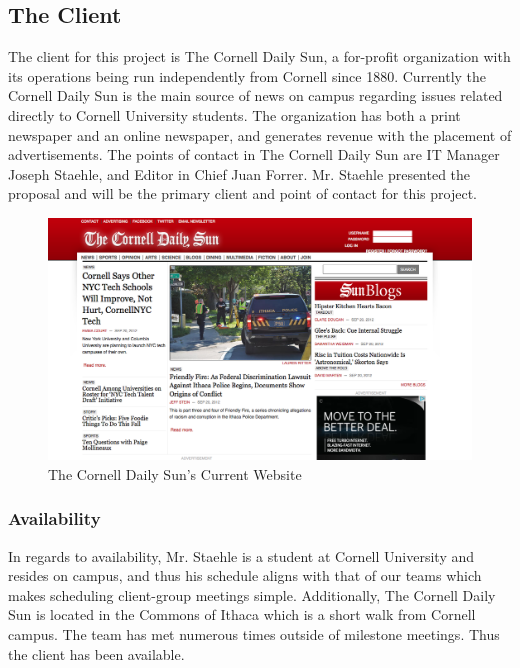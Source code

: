 \documentclass[11pt]{article} %
\begin{document}
\subsection{The Client}

The client for this project is The Cornell Daily Sun, a for-profit organization with its operations being run independently from Cornell since 1880. Currently the Cornell Daily Sun is the main source of news on campus regarding issues related directly to Cornell University students. The organization has both a print newspaper and an online newspaper, and generates revenue with the placement of advertisements. The points of contact in The Cornell Daily Sun are IT Manager Joseph Staehle, and Editor in Chief Juan Forrer.  Mr. Staehle presented the proposal and will be the primary client and point of contact for this project.

\begin{figure}[h]
\begin{center}
\includegraphics[width=\columnwidth]{images/cornell_sun_current}
\end{center}
\caption{The Cornell Daily Sun's Current Website}
\end{figure}

\subsubsection{Availability}

In regards to availability, Mr. Staehle is a student at Cornell University and resides on campus, and thus his schedule aligns with that of our teams which makes scheduling client-group meetings simple. Additionally, The Cornell Daily Sun is located in the Commons of Ithaca which is a short walk from Cornell campus. The team has met numerous times outside of milestone meetings. Thus the client has been available.
\end{document}
